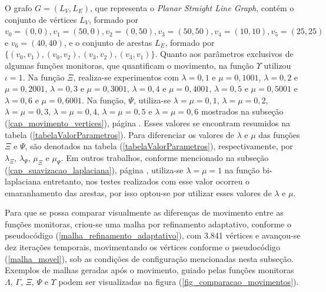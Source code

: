 O grafo $G = (L_V,L_E)$, que representa o {\it Planar Straight Line Graph}, contém o conjunto de vértices $L_V$, formado por $v_0 = (0,0), v_1 = (50,0), v_2 = (0,50), v_3 = (50,50), v_4 = (10,10), v_5 = (25,25)$ e $v_6 = (40,40)$, e o conjunto de arestas $L_E $, formado por $\{(v_0, v_1), (v_0,v_2), (v_3,v_2), (v_3, v_1)\}$. Quanto aos parâmetros exclusivos de algumas funções monitoras, que quantificam o movimento, na função $\Upsilon$ utilizou $\iota = 1$. Na função $\Xi$, realiza-se experimentos com $\lambda = 0,1$ e $\mu = 0,1001$, $\lambda = 0,2$ e $\mu = 0,2001$, $\lambda = 0,3$ e $\mu = 0,3001$, $\lambda = 0,4$ e $\mu = 0,4001$, $\lambda = 0,5$ e $\mu = 0,5001$ e $\lambda = 0,6$ e $\mu = 0,6001$. Na função, $\Psi$, utiliza-se $\lambda = \mu = 0,1$, $\lambda = \mu = 0,2$, $\lambda = \mu = 0,3$, $\lambda = \mu = 0,4$, $\lambda = \mu = 0,5$ e  $\lambda = \mu = 0,6$ mostrados na subseção (\ref{cap_movimento_vertices}), página \pageref{cap_movimento_vertices}. Esses valores se encontram resumidos na tabela (\ref{tabelaValorParametros}). Para diferenciar os valores de $\lambda$ e $\mu$ das funções $\Xi$ e $\Psi$, são denotados na tabela (\ref{tabelaValorParametros}), respectivamente, por $\lambda_{\Xi}$, $\lambda_{\Psi}$, $\mu_{\Xi}$ e $\mu_{\Psi}$. Em outros trabalhos, conforme mencionado na subseção (\ref{cap_suavizacao_laplaciana}), página \pageref{cap_suavizacao_laplaciana}, utiliza-se $\lambda = \mu= 1$ na função bi-laplaciana entretanto, nos testes realizados com esse valor ocorreu o emaranhamento das arestas, por isso optou-se por utilizar esses valores de $\lambda$ e $\mu$.

Para que se possa comparar visualmente as diferenças de movimento entre as funções monitoras, criou-se uma malha por refinamento adaptativo, conforme o pseudocódigo (\ref{malha_refinamento_adaptativo}), com 3.841 vértices e avançou-se dez iterações temporais, movimentando os vértices conforme o pseudocódigo (\ref{malha_movel}), sob as condições de configuração mencionadas nesta subseção. Exemplos de malhas geradas após o movimento, guiado pelas funções monitoras $\Lambda$, $\Gamma$, $\Xi$, $\Psi$ e $\Upsilon$ podem ser visualizadas na figura (\ref{fig_comparacao_movimentos}).

